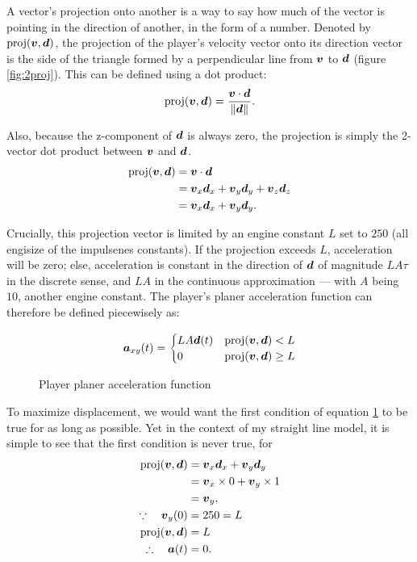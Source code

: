 A vector's projection onto another is a way to say how much of the vector is pointing in the direction of another, in the form of a number. Denoted by $\text{proj}(\boldsymbol{v}, \boldsymbol{d})$, the projection of the player's velocity vector onto its direction vector is the side of the triangle formed by a perpendicular line from $\boldsymbol{v}$ to $\boldsymbol{d}$ (figure \ref{fig:2proj}). This can be defined using a dot product:
\[
    \text{proj}(\boldsymbol{v}, \boldsymbol{d}) = \frac{\boldsymbol{v} \cdot \boldsymbol{d}}{\|\boldsymbol{d}\|}.
\]

Also, because the z-component of $\boldsymbol{d}$ is always zero, the projection is simply the 2-vector dot product between $\boldsymbol{v}$ and $\boldsymbol{d}$.
\begin{align*}
    \text{proj}(\boldsymbol{v}, \boldsymbol{d}) &= \boldsymbol{v} \cdot \boldsymbol{d}\\
    &= \boldsymbol{v}_x \boldsymbol{d}_x + \boldsymbol{v}_y \boldsymbol{d}_y + \boldsymbol{v}_z \boldsymbol{d}_z\\
    &= \boldsymbol{v}_x \boldsymbol{d}_x + \boldsymbol{v}_y \boldsymbol{d}_y.
\end{align*}

Crucially, this projection vector is limited by an engine constant $L$ set to $250$ (all engisize of the impulsenes constants). If the projection exceeds $L$, acceleration will be zero; else, acceleration is constant in the direction of $\boldsymbol{d}$ of magnitude $LA\tau$ in the discrete sense, and $LA$ in the continuous approximation --- with $A$ being $10$, another engine constant. The player's planer acceleration function can therefore be defined piecewisely as:
\begin{figure}[H]
    \centering
    \[
        \boldsymbol{a}_{xy}(t) = \begin{cases}
            LA \boldsymbol{d}(t) & \text{proj}(\boldsymbol{v}, \boldsymbol{d}) < L\\
            0 & \text{proj}(\boldsymbol{v}, \boldsymbol{d}) \geq L
        \end{cases}
    \]
        \caption{Player planer acceleration function}
    \label{eq:playeracceleration}

\end{figure}

To maximize displacement, we would want the first condition of equation \ref{eq:playeracceleration} to be true for as long as possible. Yet in the context of my straight line model, it is simple to see that the first condition is never true, for
\begin{align*}
    \text{proj}(\boldsymbol{v}, \boldsymbol{d}) &= \boldsymbol{v}_x \boldsymbol{d}_x + \boldsymbol{v}_y \boldsymbol{d}_y\\
    &= \boldsymbol{v}_x \times 0 + \boldsymbol{v}_y \times 1\\
    &= \boldsymbol{v}_y,\\
    \because \quad \boldsymbol{v}_{y}(0) &= 250 = L\\
    \text{proj}(\boldsymbol{v}, \boldsymbol{d}) &= L\\
    \therefore  \quad \boldsymbol{a}(t) &= 0.
\end{align*}

